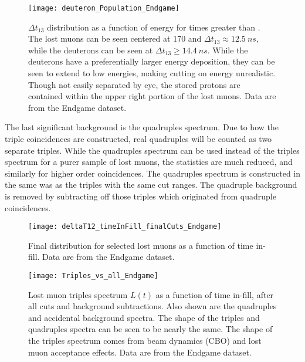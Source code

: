 \begin{figure}[h]
    \centering
    \texttt{[image: deuteron\_Population\_Endgame]}
    \caption[Deuteron population at late times]{$\Delta t_{13}$ distribution as a function of energy for times greater than . The lost muons can be seen centered at 170 \MeV and $\Delta t_{13} \approx \SI{12.5}{ns}$, while the deuterons can be seen at $\Delta t_{13} \geq \SI{14.4}{ns}$. While the deuterons have a preferentially larger energy deposition, they can be seen to extend to low energies, making cutting on energy unrealistic. Though not easily separated by eye, the stored protons are contained within the upper right portion of the lost muons. Data are from the Endgame dataset.}
    \label{fig:deuteronPop}
\end{figure}


The last significant background is the quadruples spectrum. Due to how the triple coincidences are constructed, real quadruples will be counted as two separate triples. While the quadruples spectrum can be used instead of the triples spectrum for a purer sample of lost muons, the statistics are much reduced, and similarly for higher order coincidences. The quadruples spectrum is constructed in the same was as the triples with the same cut ranges. The quadruple background is removed by subtracting off those triples which originated from quadruple coincidences.


\begin{figure}
    \centering
    \texttt{[image: deltaT12\_timeInFill\_finalCuts\_Endgame]}
    \caption[Final \DT distribution for selected lost muons]{Final \DT distribution for selected lost muons as a function of time in-fill. Data are from the Endgame dataset.}
    \label{fig:finalDT12Dist}
\end{figure}

\begin{figure}
    \centering
    \texttt{[image: Triples\_vs\_all\_Endgame]}
    \caption[Lost muon triples spectrum compared to quadruples and accidental background]{Lost muon triples spectrum $L(t)$ as a function of time in-fill, after all cuts and background subtractions. Also shown are the quadruples and accidental background spectra. The shape of the triples and quadruples spectra can be seen to be nearly the same. The shape of the triples spectrum comes from beam dynamics (CBO) and lost muon acceptance effects. Data are from the Endgame dataset.}
    \label{fig:triples}
\end{figure}


